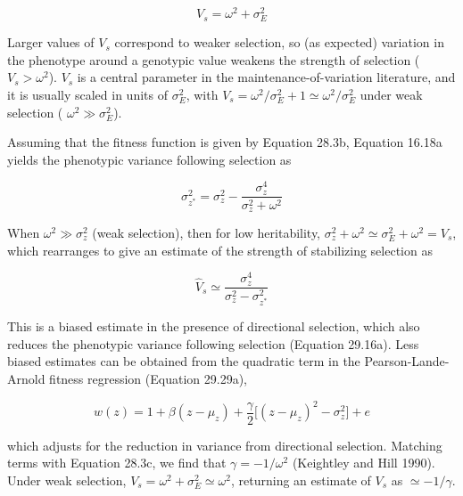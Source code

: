 \documentclass{article}
\begin{document}
\begin{equation}
V_{s}=\omega^{2}+\sigma_{E}^{2}
\tag{28.3f}
\label{eq:28_3f}
\end{equation}

Larger values of  $ V_s $ correspond to weaker selection, so (as expected) variation in the phenotype around a genotypic value weakens the strength of selection ( $ V_s > \omega^2 $).  $ V_s $ is a central parameter in the maintenance-of-variation literature, and it is usually scaled in units of  $ \sigma_E^2 $, with  $ V_s = \omega^2 / \sigma_E^2 + 1 \simeq \omega^2 / \sigma_E^2 $ under weak selection ( $ \omega^2 \gg \sigma_E^2 $).

Assuming that the fitness function is given by Equation 28.3b, Equation 16.18a yields the phenotypic variance following selection as

\begin{equation}
\sigma_{z^{*}}^{2}=\sigma_{z}^{2}-\frac{\sigma_{z}^{4}}{\sigma_{z}^{2}+\omega^{2}}
\tag{28.3g}
\label{eq:28_3g}
\end{equation}

When  $ \omega^2 \gg \sigma_z^2 $ (weak selection), then for low heritability,  $ \sigma_z^2 + \omega^2 \simeq \sigma_E^2 + \omega^2 = V_s $, which rearranges to give an estimate of the strength of stabilizing selection as

\begin{equation}
\widehat{V}_{s}\simeq\frac{\sigma_{z}^{4}}{\sigma_{z}^{2}-\sigma_{z^{*}}^{2}}
\tag{28.3h}
\label{eq:28_3h}
\end{equation}

This is a biased estimate in the presence of directional selection, which also reduces the phenotypic variance following selection (Equation 29.16a). Less biased estimates can be obtained from the quadratic term in the Pearson-Lande-Arnold fitness regression (Equation 29.29a),

\begin{equation}
w(z)=1+\beta(z-\mu_{z})+\frac{\gamma}{2}\Biggl[(z-\mu_{z})^{2}-\sigma_{z}^{2}\Biggr]+e
\tag{28.3i}
\label{eq:28_3i}
\end{equation}

which adjusts for the reduction in variance from directional selection. Matching terms with Equation 28.3c, we find that  $ \gamma = -1/\omega^2 $ (Keightley and Hill 1990). Under weak selection,  $ V_s = \omega^2 + \sigma_E^2 \simeq \omega^2 $, returning an estimate of  $ V_s $ as  $ \simeq -1/\gamma $.
\end{document}
